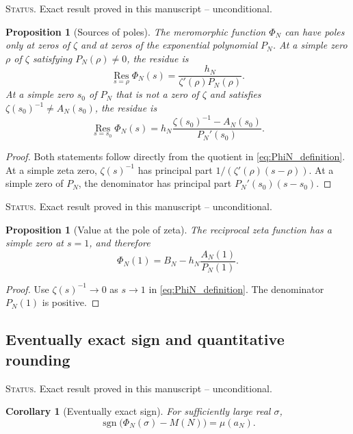 \documentclass[11pt]{amsart}
\numberwithin{equation}{section}
\theoremstyle{plain}
\newtheorem{proposition}[theorem]{Proposition}
\newtheorem{corollary}[theorem]{Corollary}
\theoremstyle{definition}
\theoremstyle{remark}
\newcommand{\1}{\mathbf{1}}
\newcommand{\statusnote}[1]{%
  \par\smallskip\noindent
  \begingroup\footnotesize\textsc{Status.} #1\endgroup
  \par\smallskip}
\begin{document}
\statusnote{Exact result proved in this manuscript -- unconditional.}
\begin{proposition}[Sources of poles]
\label{prop:sources_of_poles}
The meromorphic function $\Phi_N$ can have poles only at zeros of $\zeta$
and at zeros of the exponential polynomial $P_N$.  At a simple zero $\rho$
of $\zeta$ satisfying $P_N(\rho)\neq0$, the residue is
\begin{equation}
\operatorname*{Res}_{s=\rho}\Phi_N(s)
=
\frac{h_N}{\zeta'(\rho)P_N(\rho)}.
\label{eq:Phi_residue_zeta_zero}
\end{equation}
At a simple zero $s_0$ of $P_N$ that is not a zero of $\zeta$ and satisfies
$\zeta(s_0)^{-1}\neq A_N(s_0)$, the residue is
\begin{equation}
\operatorname*{Res}_{s=s_0}\Phi_N(s)
=
h_N\frac{\zeta(s_0)^{-1}-A_N(s_0)}{P_N'(s_0)}.
\label{eq:Phi_residue_P_zero}
\end{equation}
\end{proposition}

\begin{proof}
Both statements follow directly from the quotient in
\eqref{eq:PhiN_definition}.  At a simple zeta zero,
$\zeta(s)^{-1}$ has principal part
$1/(\zeta'(\rho)(s-\rho))$.  At a simple zero of $P_N$, the denominator has
principal part $P_N'(s_0)(s-s_0)$.
\end{proof}

\statusnote{Exact result proved in this manuscript -- unconditional.}
\begin{proposition}[Value at the pole of zeta]
\label{prop:Phi_at_one}
The reciprocal zeta function has a simple zero at $s=1$, and therefore
\begin{equation}
\Phi_N(1)
=
B_N-h_N\frac{A_N(1)}{P_N(1)}.
\label{eq:Phi_at_one}
\end{equation}
\end{proposition}

\begin{proof}
Use $\zeta(s)^{-1}\to0$ as $s\to1$ in
\eqref{eq:PhiN_definition}.  The denominator $P_N(1)$ is positive.
\end{proof}

\subsection{Eventually exact sign and quantitative rounding}
\label{subsec:eventual_sign_rounding}

\statusnote{Exact result proved in this manuscript -- unconditional.}
\begin{corollary}[Eventually exact sign]
\label{cor:eventual_sign}
For sufficiently large real $\sigma$,
\begin{equation}
\operatorname{sgn}\bigl(\Phi_N(\sigma)-M(N)\bigr)
=
\mu(a_N).
\label{eq:eventual_sign}
\end{equation}
\end{corollary}
\end{document}
